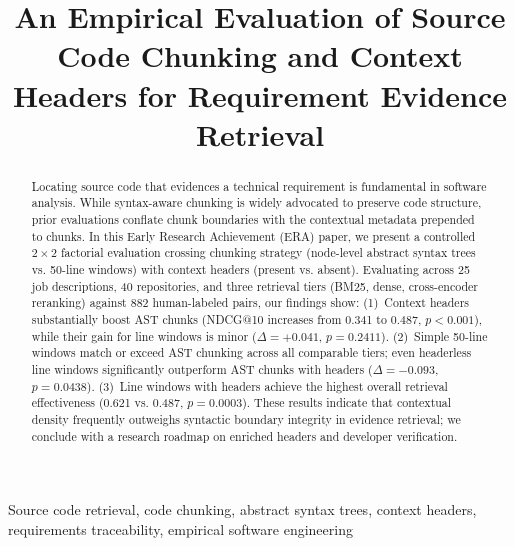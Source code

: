 \documentclass[10pt,conference]{IEEEtran}
\begin{document}
\title{An Empirical Evaluation of Source Code Chunking and Context Headers for Requirement Evidence Retrieval}

\author{}

\maketitle

\begin{abstract}
Locating source code that evidences a technical requirement is fundamental in software analysis. 
While syntax-aware chunking is widely advocated to preserve code structure, prior evaluations conflate chunk boundaries with the contextual metadata prepended to chunks. 
In this Early Research Achievement (ERA) paper, we present a controlled $2 \times 2$ factorial evaluation crossing chunking strategy (node-level abstract syntax trees vs. 50-line windows) with context headers (present vs. absent). 
Evaluating across 25 job descriptions, 40 repositories, and three retrieval tiers (BM25, dense, cross-encoder reranking) against 882 human-labeled pairs, our findings show: 
(1)~Context headers substantially boost AST chunks (NDCG@10 increases from 0.341 to 0.487, $p < 0.001$), while their gain for line windows is minor ($\Delta = +0.041$, $p = 0.2411$). 
(2)~Simple 50-line windows match or exceed AST chunking across all comparable tiers; even headerless line windows significantly outperform AST chunks with headers ($\Delta = -0.093$, $p = 0.0438$). 
(3)~Line windows with headers achieve the highest overall retrieval effectiveness (0.621 vs. 0.487, $p = 0.0003$). 
These results indicate that contextual density frequently outweighs syntactic boundary integrity in evidence retrieval; we conclude with a research roadmap on enriched headers and developer verification.
\end{abstract}

\begin{IEEEkeywords}
Source code retrieval, code chunking, abstract syntax trees, context headers, requirements traceability, empirical software engineering
\end{IEEEkeywords}











\end{document}

